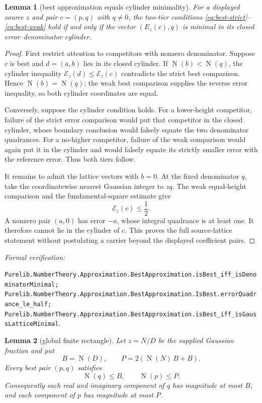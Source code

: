\documentclass[11pt]{article}
\newtheorem{lemma}[lemma]{Lemma}
\newcommand{\Norm}[1]{\operatorname{N}\!\left(#1\right)}
\newcommand{\leanref}[1]{\par\smallskip\noindent
  \emph{Formal verification:}\par\nobreak
  {\raggedright\nolinkurl{#1}.\par}}
\begin{document}
\begin{lemma}[best approximation equals cylinder minimality]
\label{lem:best-equals-minimal}
For a displayed source $z$ and pair $c=(p,q)$ with $q\ne0$, the two-tier
conditions \eqref{eq:best-strict}--\eqref{eq:best-weak} hold if and only if
the vector $(E_z(c),q)$ is minimal in its closed error--denominator cylinder.
\end{lemma}

\begin{proof}
First restrict attention to competitors with nonzero denominator.  Suppose
$c$ is best and $d=(a,b)$ lies in its closed cylinder.  If
$\Norm b<\Norm q$, the cylinder inequality
$\mathcal E_z(d)\le\mathcal E_z(c)$ contradicts the strict best comparison.
Hence $\Norm b=\Norm q$; the weak best comparison supplies the reverse error
inequality, so both cylinder coordinates are equal.

Conversely, suppose the cylinder condition holds.  For a lower-height
competitor, failure of the strict error comparison would put that competitor
in the closed cylinder, whose boundary conclusion would falsely equate the
two denominator quadrances.  For a no-higher competitor, failure of the weak
comparison would again put it in the cylinder and would falsely equate its
strictly smaller error with the reference error.  Thus both tiers follow.

It remains to admit the lattice vectors with $b=0$.  At the fixed denominator
$q$, take the coordinatewise nearest Gaussian integer to $zq$.  The weak
equal-height comparison and the fundamental-square estimate give
\begin{equation}
\label{eq:best-error-half}
                         \mathcal E_z(c)\le\frac12.
\end{equation}
A nonzero pair $(a,0)$ has error $-a$, whose integral quadrance is at least
one.  It therefore cannot lie in the cylinder of $c$.  This proves the full
source-lattice statement without postulating a carrier beyond the displayed
coefficient pairs.
\end{proof}

\leanref{Purelib.NumberTheory.Approximation.BestApproximation.isBest_iff_isDenominatorMinimal;
Purelib.NumberTheory.Approximation.BestApproximation.IsBest.errorQuadrance_le_half;
Purelib.NumberTheory.Approximation.BestApproximation.isBest_iff_isGaussLatticeMinimal}

\begin{lemma}[global finite rectangle]
\label{lem:all-best-rectangle}
Let $z=N/D$ be the supplied Gaussian fraction and put
\begin{equation}
\label{eq:all-best-bounds}
                 B=\Norm D,
        \qquad   P=2(\Norm N\,B+B).
\end{equation}
Every best pair $(p,q)$ satisfies
\begin{equation}
\label{eq:all-best-norm-bounds}
                         \Norm q\le B,
             \qquad     \Norm p\le P.
\end{equation}
Consequently each real and imaginary component of $q$ has magnitude at most
$B$, and each component of $p$ has magnitude at most $P$.
\end{lemma}
\end{document}
